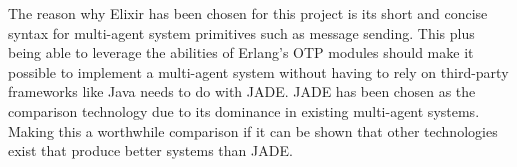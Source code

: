 The reason why Elixir has been chosen for this project is its short and concise syntax for multi-agent system primitives such as message sending.
This plus being able to leverage the abilities of Erlang's OTP modules should make it possible to implement a multi-agent system without having to rely on third-party frameworks like Java needs to do with JADE\@.
JADE has been chosen as the comparison technology due to its dominance in existing multi-agent systems.
Making this a worthwhile comparison if it can be shown that other technologies exist that produce better systems than JADE\@.
